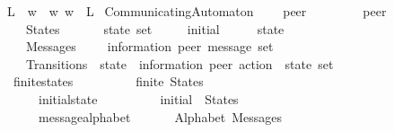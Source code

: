 \begin{isabellebody}
\ \ {\isachardoublequoteopen}L{\isasymdownharpoonright}\isactrlsub {\isacharbang}{\kern0pt}\isactrlsub {\isacharquery}{\kern0pt}\ {\isasymequiv}\ {\isacharbraceleft}{\kern0pt}w{\isasymdown}\isactrlsub {\isacharbang}{\kern0pt}\isactrlsub {\isacharquery}{\kern0pt}\ {\isacharbar}{\kern0pt}\ w{\isachardot}{\kern0pt}\ w\ {\isasymin}\ L{\isacharbraceright}{\kern0pt}{\isachardoublequoteclose}%
\isadelimdocument
%
\endisadelimdocument
%
\isatagdocument
%
\isamarkuptrue%
%
\endisatagdocument
{\isafolddocument}%
%
\isadelimdocument
%
\endisadelimdocument
{}\isamarkupfalse%
\ CommunicatingAutomaton\ {\isacharequal}{\kern0pt}\isanewline
\ \ \ peer\ \ \ \ \ \ \ \ {\isacharcolon}{\kern0pt}{\isacharcolon}{\kern0pt}\ {\isachardoublequoteopen}{\isacharprime}{\kern0pt}peer{\isachardoublequoteclose}\isanewline
\ \ \ \ \ States\ \ \ \ \ \ {\isacharcolon}{\kern0pt}{\isacharcolon}{\kern0pt}\ {\isachardoublequoteopen}{\isacharprime}{\kern0pt}state\ set{\isachardoublequoteclose}\isanewline
\ \ \ \ \ initial\ \ \ \ \ {\isacharcolon}{\kern0pt}{\isacharcolon}{\kern0pt}\ {\isachardoublequoteopen}{\isacharprime}{\kern0pt}state{\isachardoublequoteclose}\isanewline
\ \ \ \ \ Messages\ \ \ \ {\isacharcolon}{\kern0pt}{\isacharcolon}{\kern0pt}\ {\isachardoublequoteopen}{\isacharparenleft}{\kern0pt}{\isacharprime}{\kern0pt}information{\isacharcomma}{\kern0pt}\ {\isacharprime}{\kern0pt}peer{\isacharparenright}{\kern0pt}\ message\ set{\isachardoublequoteclose}\isanewline
\ \ \ \ \ Transitions\ {\isacharcolon}{\kern0pt}{\isacharcolon}{\kern0pt}\ {\isachardoublequoteopen}{\isacharparenleft}{\kern0pt}{\isacharprime}{\kern0pt}state\ {\isasymtimes}\ {\isacharparenleft}{\kern0pt}{\isacharprime}{\kern0pt}information{\isacharcomma}{\kern0pt}\ {\isacharprime}{\kern0pt}peer{\isacharparenright}{\kern0pt}\ action\ {\isasymtimes}\ {\isacharprime}{\kern0pt}state{\isacharparenright}{\kern0pt}\ set{\isachardoublequoteclose}\isanewline
\ \ \ finite{\isacharunderscore}{\kern0pt}states{\isacharcolon}{\kern0pt}\ \ \ \ \ \ \ \ \ \ {\isachardoublequoteopen}finite\ States{\isachardoublequoteclose}\isanewline
\ \ \ \ \ \ \ initial{\isacharunderscore}{\kern0pt}state{\isacharcolon}{\kern0pt}\ \ \ \ \ \ \ \ \ \ {\isachardoublequoteopen}initial\ {\isasymin}\ States{\isachardoublequoteclose}\isanewline
\ \ \ \ \ \ \ message{\isacharunderscore}{\kern0pt}alphabet{\isacharcolon}{\kern0pt}\ \ \ \ \ \ \ {\isachardoublequoteopen}Alphabet\ Messages{\isachardoublequoteclose}\isanewline

\end{isabellebody}
